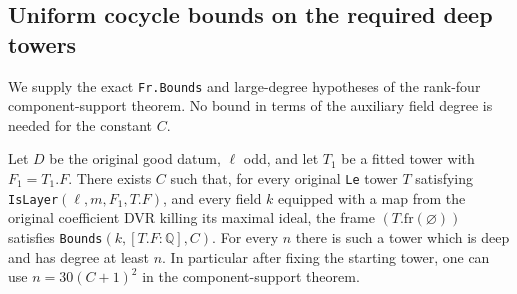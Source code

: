 \subsection{Uniform cocycle bounds on the required deep towers}
\label{subsec:rh-four-uniform-tower-bounds}

We supply the exact \texttt{Fr.Bounds} and large-degree hypotheses
of the rank-four component-support theorem. No bound in terms of
the auxiliary field degree is needed for the constant $C$.

\begin{theorem}
\label{thm:rh-four-x2}
Let $D$ be the original good datum, $\ell$ odd, and let $T_1$
be a fitted tower with $F_1=T_1.F$. There exists $C$ such that,
for every original \texttt{Le} tower $T$ satisfying
\texttt{IsLayer}$(\ell,m,F_1,T.F)$, and every field $k$ equipped
with a map from the original coefficient DVR killing its maximal
ideal, the frame $(T.\mathrm{fr}(\varnothing))$ satisfies
\texttt{Bounds}$(k,[T.F:\mathbb Q],C)$.
For every $n$ there is such a tower which is deep and has degree
at least $n$. In particular after fixing the starting tower,
one can use $n=30(C+1)^2$ in the component-support theorem.
\end{theorem}

